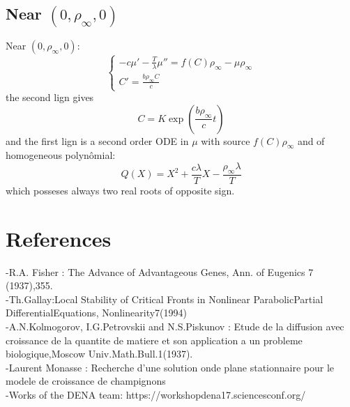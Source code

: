 \documentclass[17pt]{extarticle}
\newcommand{\Tl}{\frac{T}{\lambda}}
\begin{document}
\subsection{Near $(0,\rho_\infty,0)$} 
Near $(0,\rho_\infty,0)$:
\begin{equation} \left\{ \begin{array}{ll} -c \mu'-\Tl\mu''=f(C)\rho_\infty-\mu\rho_\infty\\C'=\frac{b\rho_\infty C}{c} \end{array}\right.
\end{equation}
the second lign gives \begin{equation}
C = K\exp(\frac{b\rho_\infty}{c}t )
\end{equation}
and the first lign is a second order ODE in $\mu$ with source $f(C)\rho_\infty$ and of homogeneous polynômial: \begin{equation}
	Q(X)=X^2+\frac{c\lambda}{T}X-\frac{\rho_\infty\lambda}{T}
\end{equation} 
which posseses always two real roots of opposite sign.
\newpage
\section{References}
-R.A. Fisher : The Advance of Advantageous Genes, Ann. of Eugenics 7 (1937),355.\\
-Th.Gallay:Local Stability of Critical Fronts in Nonlinear ParabolicPartial DifferentialEquations, Nonlinearity7(1994)\\
-A.N.Kolmogorov, I.G.Petrovskii and  N.S.Piskunov : Etude de la diffusion avec croissance de la quantite de matiere et son application a un probleme biologique,Moscow Univ.Math.Bull.1(1937).\\
-Laurent Monasse : Recherche d’une solution onde plane stationnaire pour le modele de croissance de champignons\\
-Works of the DENA team: https://workshopdena17.sciencesconf.org/
\end{document}
